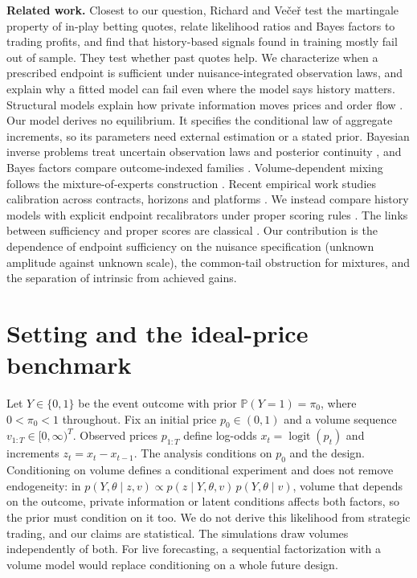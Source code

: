 \documentclass[runningheads]{llncs}
\newcommand{\Prob}{\mathbb P}
\newcommand{\logit}{\operatorname{logit}}
\begin{document}
\medskip\noindent\textbf{Related work.}
Closest to our question, Richard and Ve\v{c}e\v{r} \cite{richard2021efficiency} test the martingale property of in-play betting quotes, relate likelihood ratios and Bayes factors to trading profits, and find that history-based signals found in training mostly fail out of sample. They test whether past quotes help. We characterize when a prescribed endpoint is sufficient under nuisance-integrated observation laws, and explain why a fitted model can fail even where the model says history matters. Structural models explain how private information moves prices and order flow \cite{kyle1985continuous,glosten1985bid}. Our model derives no equilibrium. It specifies the conditional law of aggregate increments, so its parameters need external estimation or a stated prior. Bayesian inverse problems treat uncertain observation laws and posterior continuity \cite{stuart2010inverse,latz2020wellposedness}, and Bayes factors compare outcome-indexed families \cite{kass1995bayes,chatterjee2020bayes}. Volume-dependent mixing follows the mixture-of-experts construction \cite{jacobs1991adaptive}. Recent empirical work studies calibration across contracts, horizons and platforms \cite{le2026calibration}. We instead compare history models with explicit endpoint recalibrators under proper scoring rules \cite{gneiting2007strictly}. The links between sufficiency and proper scores are classical \cite{pitman1936sufficient,broecker2009reliability}. Our contribution is the dependence of endpoint sufficiency on the nuisance specification (unknown amplitude against unknown scale), the common-tail obstruction for mixtures, and the separation of intrinsic from achieved gains.

\section{Setting and the ideal-price benchmark}
\label{sec:model}
Let $Y\in\{0,1\}$ be the event outcome with prior $\Prob(Y=1)=\pi_0$, where $0<\pi_0<1$ throughout. Fix an initial price $p_0\in(0,1)$ and a volume sequence $v_{1:T}\in[0,\infty)^T$. Observed prices $p_{1:T}$ define log-odds $x_t=\logit(p_t)$ and increments $z_t=x_t-x_{t-1}$. The analysis conditions on $p_0$ and the design. Conditioning on volume defines a conditional experiment and does not remove endogeneity: in $p(Y,\theta\mid z,v)\propto p(z\mid Y,\theta,v)\,p(Y,\theta\mid v)$, volume that depends on the outcome, private information or latent conditions affects both factors, so the prior must condition on it too. We do not derive this likelihood from strategic trading, and our claims are statistical. The simulations draw volumes independently of both. For live forecasting, a sequential factorization with a volume model would replace conditioning on a whole future design.
\end{document}
